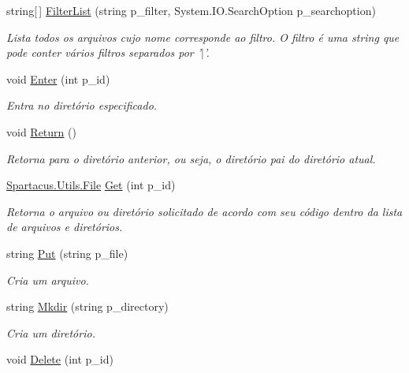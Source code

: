 \begin{DoxyCompactItemize}
string\mbox{[}$\,$\mbox{]} \hyperlink{classSpartacus_1_1Utils_1_1FileExplorer_a1af76e64b4bb7ff7075179c881c08b71}{Filter\+List} (string p\+\_\+filter, System.\+I\+O.\+Search\+Option p\+\_\+searchoption)
\begin{DoxyCompactList}\small\item\em Lista todos os arquivos cujo nome corresponde ao filtro. O filtro é uma string que pode conter vários filtros separados por '$\vert$'. \end{DoxyCompactList}\item 
void \hyperlink{classSpartacus_1_1Utils_1_1FileExplorer_ac9273b0e7cd1365d67c60b9255e6f538}{Enter} (int p\+\_\+id)
\begin{DoxyCompactList}\small\item\em Entra no diretório especificado. \end{DoxyCompactList}\item 
void \hyperlink{classSpartacus_1_1Utils_1_1FileExplorer_a79d43d93289567d3d0544d9c7b61949e}{Return} ()
\begin{DoxyCompactList}\small\item\em Retorna para o diretório anterior, ou seja, o diretório pai do diretório atual. \end{DoxyCompactList}\item 
\hyperlink{classSpartacus_1_1Utils_1_1File}{Spartacus.\+Utils.\+File} \hyperlink{classSpartacus_1_1Utils_1_1FileExplorer_a75222d9146d14fb15e5fe46b0fa1f3c9}{Get} (int p\+\_\+id)
\begin{DoxyCompactList}\small\item\em Retorna o arquivo ou diretório solicitado de acordo com seu código dentro da lista de arquivos e diretórios. \end{DoxyCompactList}\item 
string \hyperlink{classSpartacus_1_1Utils_1_1FileExplorer_ad6f65e809b0c424f639dde8d6fd5d85f}{Put} (string p\+\_\+file)
\begin{DoxyCompactList}\small\item\em Cria um arquivo. \end{DoxyCompactList}\item 
string \hyperlink{classSpartacus_1_1Utils_1_1FileExplorer_a40dcbbe8a4d5def3f833e528466047b7}{Mkdir} (string p\+\_\+directory)
\begin{DoxyCompactList}\small\item\em Cria um diretório. \end{DoxyCompactList}\item 
void \hyperlink{classSpartacus_1_1Utils_1_1FileExplorer_ac36b8cdbb3a886587a8891d61fa8ed90}{Delete} (int p\+\_\+id)

\end{DoxyCompactItemize}

